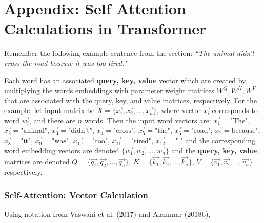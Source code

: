 \section{Appendix: Self Attention Calculations in Transformer} \label{app:TransformerSelfAttnCalc}

Remember the following example sentence from the  section: \textit{``The animal didn't cross the road because it was too tired."}

Each word has an associated \textbf{query, key, value} vector which are created by multiplying the words embeddings with parameter weight matrices $W^Q, W^K, W^V$ that are associated with the query, key, and value matrices, respectively. For the example, let input matrix be $X = \{\overrightarrow{x_1}, \overrightarrow{x_2}, ..., \overrightarrow{x_n}\}$, where vector $\overrightarrow{x_i}$ corresponds to word $\overrightarrow{w_i}$, and there are $n$ words. Then the input word vectors are: 
$\overrightarrow{x_1} = \text{"The"}$, 
$\overrightarrow{x_2} = \text{"animal"}$, 
$\overrightarrow{x_3} = \text{"didn't"}$, 
$\overrightarrow{x_4} = \text{"cross"}$, 
$\overrightarrow{x_5} = \text{"the"}$, 
$\overrightarrow{x_6} = \text{"road"}$, 
$\overrightarrow{x_7} = \text{because"}$, 
$\overrightarrow{x_8} = \text{"it"}$, 
$\overrightarrow{x_9} = \text{"was"}$, 
$\overrightarrow{x_{10}} = \text{"too"}$, 
$\overrightarrow{x_{11}} = \text{"tired"}$, 
$\overrightarrow{x_{12}}$ = "."
and the corresponding word embedding vectors are denoted $\Big\{ \overrightarrow{w_1}, \overrightarrow{w_2}, ..., \overrightarrow{w_n} \Big\}$ and the \textbf{query, key, value} matrices are denoted $Q = \Big\{\overrightarrow{q_1}, \overrightarrow{q_2}, ..., \overrightarrow{q_n} \Big\}$, $K = \Big\{\overrightarrow{k_1}, \overrightarrow{k_2}, ..., \overrightarrow{k_n} \Big\}$, $V = \Big\{\overrightarrow{v_1}, \overrightarrow{v_2}, ..., \overrightarrow{v_n} \Big\}$ respectively.


\subsubsection{Self-Attention: Vector Calculation}

Using notation from Vaswani et al. (2017) and Alammar (2018b), 

